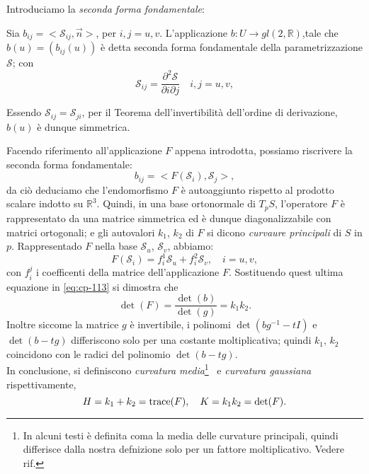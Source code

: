 Introduciamo la \emph{seconda forma fondamentale}:
\begin{definizione}
Sia $b_{ij}=<\mathcal{S}_{ij},\vec{n}>$, per $i,j=u,v$. L'applicazione $b:U\longrightarrow gl(2,\mathbb{R})$,tale che $b(u)=(b_{ij}(u))$ è detta seconda forma fondamentale della parametrizzazione $\mathcal{S}$; con
\[
\mathcal{S}_{ij}=\frac{\partial^2\mathcal{S}}{\partial i\partial j}\quad i,j = u,v,
\]
\end{definizione}
\begin{osservazione}
Essendo $\mathcal{S}_{ij}=\mathcal{S}_{ji}$, per il Teorema dell'invertibilità dell'ordine di derivazione, $b(u)$ è dunque simmetrica.
\end{osservazione}
Facendo riferimento all'applicazione $F$ appena introdotta, possiamo riscrivere la seconda forma fondamentale:
\begin{equation}
\label{eq:cp-113}
b_{ij}=<F(\mathcal{S}_i),\mathcal{S}_j>,
\end{equation}
da ciò deduciamo che l'endomorfismo $F$ è autoaggiunto rispetto al prodotto scalare indotto su $\mathbb{R}^3$. Quindi, in una base ortonormale di $T_pS$, l'operatore $F$ è rappresentato da una matrice simmetrica ed è dunque diagonalizzabile con matrici ortogonali; e gli autovalori $k_1$, $k_2$ di $F$ si dicono \emph{curvaure principali} di $S$ in $p$. Rappresentado $F$ nella base $\mathcal{S}_u$, $\mathcal{S}_v$, abbiamo:
\[
F(\mathcal{S}_i) = f_i^1\mathcal{S}_u + f_i^2\mathcal{S}_v,\quad i=u,v,
\]
con $f_i^j$ i coefficenti della matrice dell'applicazione $F$. Sostituendo quest ultima equazione in \eqref{eq:cp-113} si dimostra che
\[
\det(F) = \frac{\det(b)}{\det(g)}=k_1k_2.
\]
Inoltre siccome la matrice $g$ è invertibile, i polinomi $\det(bg^{-1}-tI)$ e $\det(b-tg)$ differiscono solo per una costante moltiplicativa; quindi $k_1$, $k_2$ coincidono con le radici del polinomio $\det(b-tg)$. \\
In conclusione, si definiscono \emph{curvatura media}\footnote{In alcuni testi è definita coma la media delle curvature principali, quindi differisce dalla nostra defnizione solo per un fattore moltiplicativo. Vedere rif.} \,%
 e \emph{curvatura gaussiana} rispettivamente,
\[
H=k_1+k_2=\operatorname{trace}(F),\quad K=k_1k_2=\det(F).
\]
